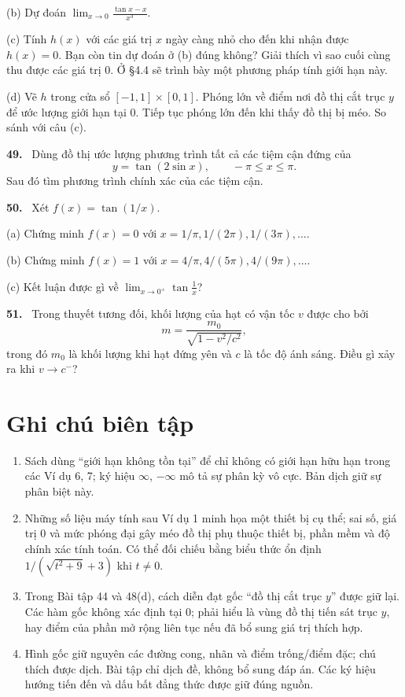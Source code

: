 \documentclass[12pt,a4paper]{article}
\newcommand{\bt}[1]{\par\smallskip\noindent\textbf{#1.}\ }
\begin{document}
(b) Dự đoán $\displaystyle\lim_{x\to0}\frac{\tan x-x}{x^3}$.

(c) Tính $h(x)$ với các giá trị $x$ ngày càng nhỏ cho đến khi nhận được $h(x)=0$. Bạn còn tin dự đoán ở (b) đúng không? Giải thích vì sao cuối cùng thu được các giá trị 0. Ở §4.4 sẽ trình bày một phương pháp tính giới hạn này.

(d) Vẽ $h$ trong cửa sổ $[-1,1]\times[0,1]$. Phóng lớn về điểm nơi đồ thị cắt trục $y$ để ước lượng giới hạn tại 0. Tiếp tục phóng lớn đến khi thấy đồ thị bị méo. So sánh với câu (c).
\bt{49} Dùng đồ thị ước lượng phương trình tất cả các tiệm cận đứng của
\[y=\tan(2\sin x),\qquad-\pi\le x\le\pi.\]
Sau đó tìm phương trình chính xác của các tiệm cận.
\bt{50} Xét $f(x)=\tan(1/x)$.

(a) Chứng minh $f(x)=0$ với $x=1/\pi,1/(2\pi),1/(3\pi),\ldots$.

(b) Chứng minh $f(x)=1$ với $x=4/\pi,4/(5\pi),4/(9\pi),\ldots$.

(c) Kết luận được gì về $\displaystyle\lim_{x\to0^+}\tan\frac1x$?
\bt{51} Trong thuyết tương đối, khối lượng của hạt có vận tốc $v$ được cho bởi
\[m=\frac{m_0}{\sqrt{1-v^2/c^2}},\]
trong đó $m_0$ là khối lượng khi hạt đứng yên và $c$ là tốc độ ánh sáng. Điều gì xảy ra khi $v\to c^-$?
\section*{Ghi chú biên tập}
\begin{enumerate}
\item Sách dùng ``giới hạn không tồn tại'' để chỉ không có giới hạn hữu hạn trong các Ví dụ 6, 7; ký hiệu $\infty$, $-\infty$ mô tả sự phân kỳ vô cực. Bản dịch giữ sự phân biệt này.
\item Những số liệu máy tính sau Ví dụ 1 minh họa một thiết bị cụ thể; sai số, giá trị 0 và mức phóng đại gây méo đồ thị phụ thuộc thiết bị, phần mềm và độ chính xác tính toán. Có thể đối chiếu bằng biểu thức ổn định $1/(\sqrt{t^2+9}+3)$ khi $t\ne0$.
\item Trong Bài tập 44 và 48(d), cách diễn đạt gốc ``đồ thị cắt trục $y$'' được giữ lại. Các hàm gốc không xác định tại 0; phải hiểu là vùng đồ thị tiến sát trục $y$, hay điểm của phần mở rộng liên tục nếu đã bổ sung giá trị thích hợp.
\item Hình gốc giữ nguyên các đường cong, nhãn và điểm trống/điểm đặc; chú thích được dịch. Bài tập chỉ dịch đề, không bổ sung đáp án. Các ký hiệu hướng tiến đến và dấu bất đẳng thức được giữ đúng nguồn.
\end{enumerate}
\end{document}
